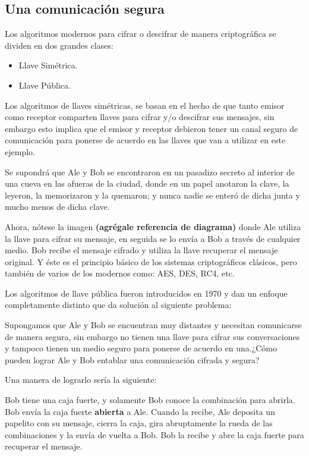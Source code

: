 \subsection{Una comunicación segura}
 
Los algoritmos modernos para cifrar o descifrar de manera criptográfica se dividen en dos grandes clases:
\begin{itemize}
\item  Llave Simétrica.
\item  Llave Pública.
\end{itemize}
Los algoritmos de llaves simétricas, se basan en el hecho de que tanto emisor como receptor comparten llaves para cifrar y/o descifrar sus mensajes, sin embargo esto implica que el emisor y receptor debieron tener un canal seguro de comunicación para ponerse de acuerdo en las llaves que van a utilizar en este ejemplo.  

Se supondrá que Ale y Bob se encontraron en un pasadizo secreto al interior de una cueva en las afueras de la ciudad, donde en un papel anotaron la clave, la leyeron, la memorizaron y la quemaron; y nunca nadie se enteró de dicha junta y mucho menos de dicha clave. 

Ahora, nótese la imagen {\bf(agrégale referencia de diagrama)} donde Ale utiliza la llave para cifrar su mensaje, en seguida se lo envía a Bob a través de cualquier medio. Bob recibe el mensaje cifrado y utiliza la llave recuperar el mensaje original. Y éste es el principio básico de los sistemas criptográficos clásicos, pero también de varios de los modernos como: AES, DES, RC4, etc.

Los algoritmos de llave pública fueron introducidos en 1970 y dan un enfoque completamente distinto que da solución al siguiente problema:

Supongamos que Ale y Bob se encuentran muy distantes y necesitan comunicarse de manera segura, sin embargo no tienen una llave para cifrar sus conversaciones y tampoco tienen un medio seguro para ponerse de acuerdo en una.¿Cómo pueden lograr Ale y Bob entablar una comunicación cifrada y segura?

Una manera de lograrlo sería la siguiente: 

Bob tiene una caja fuerte, y solamente Bob conoce la combinación para abrirla. Bob envía la caja fuerte {\bf abierta}  a Ale. Cuando la recibe, Ale deposita un papelito con su mensaje, cierra la caja, gira abruptamente la rueda de las combinaciones y la envía de vuelta a Bob. Bob la recibe y abre la caja fuerte para recuperar el mensaje.

